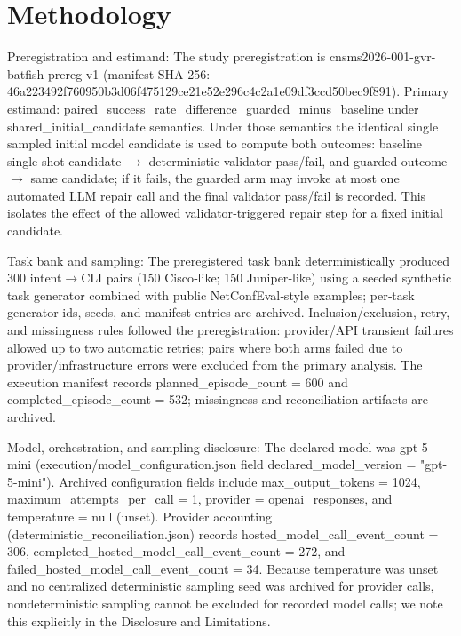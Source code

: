 \documentclass[conference]{IEEEtran}
\begin{document}
\section{Methodology}
Preregistration and estimand: The study preregistration is cnsms2026-001-gvr-batfish-prereg-v1 (manifest SHA‑256: 46a22349\allowbreak{}2f760950\allowbreak{}b3d06f47\allowbreak{}5129ce21\allowbreak{}e52e296c\allowbreak{}4c2a1e09\allowbreak{}df3ccd50\allowbreak{}bec9f891). Primary estimand: paired\_success\_rate\_difference\_guarded\_minus\_baseline under shared\_initial\_candidate semantics. Under those semantics the identical single sampled initial model candidate is used to compute both outcomes: baseline single‑shot candidate \ensuremath{\rightarrow} deterministic validator pass/fail, and guarded outcome \ensuremath{\rightarrow} same candidate; if it fails, the guarded arm may invoke at most one automated LLM repair call and the final validator pass/fail is recorded. This isolates the effect of the allowed validator‑triggered repair step for a fixed initial candidate.

Task bank and sampling: The preregistered task bank deterministically produced 300 intent\ensuremath{\rightarrow}CLI pairs (150 Cisco‑like; 150 Juniper‑like) using a seeded synthetic task generator combined with public NetConfEval‑style examples; per‑task generator ids, seeds, and manifest entries are archived. Inclusion/exclusion, retry, and missingness rules followed the preregistration: provider/API transient failures allowed up to two automatic retries; pairs where both arms failed due to provider/infrastructure errors were excluded from the primary analysis. The execution manifest records planned\_episode\_count = 600 and completed\_episode\_count = 532; missingness and reconciliation artifacts are archived.

Model, orchestration, and sampling disclosure: The declared model was gpt-5-mini (execution/model\_configuration.json field declared\_model\_version = "gpt-5-mini"). Archived configuration fields include max\_output\_tokens = 1024, maximum\_attempts\_per\_call = 1, provider = openai\_responses, and temperature = null (unset). Provider accounting (deterministic\_reconciliation.json) records hosted\_model\_call\_event\_count = 306, completed\_hosted\_model\_call\_event\_count = 272, and failed\_hosted\_model\_call\_event\_count = 34. Because temperature was unset and no centralized deterministic sampling seed was archived for provider calls, nondeterministic sampling cannot be excluded for recorded model calls; we note this explicitly in the Disclosure and Limitations.
\end{document}

